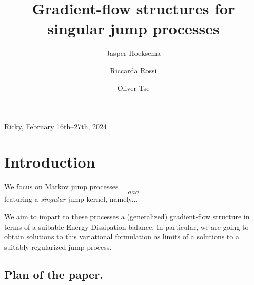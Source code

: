 \documentclass[11pt,reqno]{amsart}
\title[]{Gradient-flow structures for singular jump processes}
\numberwithin{equation}{section}
\theoremstyle{definition}
\numberwithin{equation}{section}
\begin{document}
\author{Jasper Hoeksema}
%
\address{}
\email{}



\author{Riccarda Rossi}
%
\address{R.\ Rossi, DIMI, Universit\`a degli studi di Brescia. Via Branze 38, I--25133 Brescia -- Italy}



\author{Oliver Tse}
%
\address{}
\email{}




\maketitle


\centerline{Ricky, February 16th--27th, 2024}



\begin{abstract}

\end{abstract}


\section{Introduction}
We focus on Markov jump processes 
\[
aaa
\]
featuring a \emph{singular} jump kernel, namely...
\par
We aim to impart to these processes a (generalized) gradient-flow structure in terms of a suibable
Energy-Dissipation balance.
In particular, we are going to obtain  solutions to this variational formulation as limits of a solutions to a suitably regularized jump process.
%
\subsection*{\bf Plan of the paper.}
\end{document}
